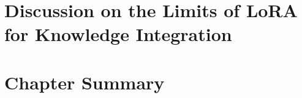 \section{Discussion on the Limits of LoRA for Knowledge Integration}
\label{sec:lora:discussion}

\section{Chapter Summary}
\label{sec:lora:summary}
